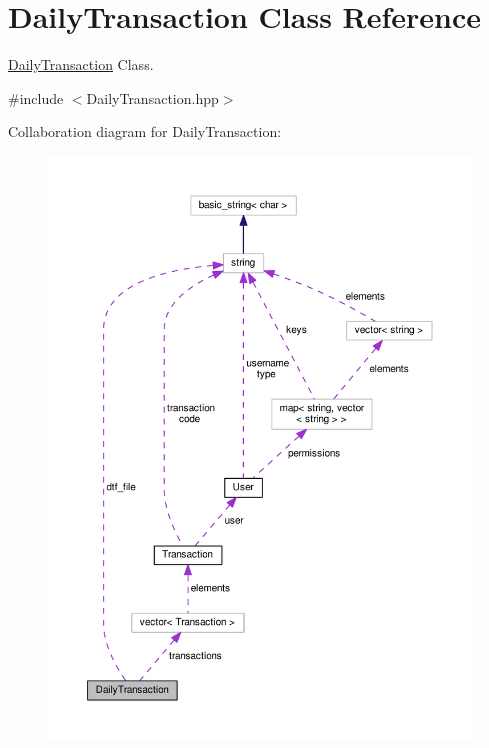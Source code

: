 \hypertarget{class_daily_transaction}{\section{Daily\-Transaction Class Reference}
\label{class_daily_transaction}
}


\hyperlink{class_daily_transaction}{Daily\-Transaction} Class.  




{\ttfamily \#include $<$Daily\-Transaction.\-hpp$>$}



Collaboration diagram for Daily\-Transaction\-:\nopagebreak
\begin{figure}[H]
\begin{center}
\leavevmode
\includegraphics[width=350pt]{class_daily_transaction__coll__graph}
\end{center}
\end{figure}
